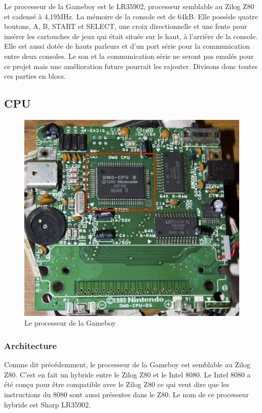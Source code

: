 \documentclass[a4paper]{article}
\begin{document}
Le processeur de la Gameboy est le LR35902, processeur semblable au Zilog Z80 et
cadensé à 4,19MHz. La mémoire de la console est de 64kB. Elle possède quatre boutons, 
A, B, START et SELECT, une croix directionnelle et une fente pour insérer les 
cartouches de jeux qui était située sur le haut, à l'arrière de la console. Elle est
aussi dotée de hauts parleurs et d'un port série pour la communication entre deux
consoles. Le son et la communication série ne seront pas emulés pour ce projet
mais une amélioration future pourrait les rajouter. Divisons donc toutes ces parties
en blocs.

\newpage


\subsection{CPU}

\begin{figure}[!h]
  \centering
  \includegraphics[scale=0.1]{images/cpu.jpg}
  \caption{Le processeur de la Gameboy}
\end{figure}

\subsubsection{Architecture}
Comme dit précédemment, le processeur de la Gameboy est semblable au Zilog Z80.
C'est en fait un hybride entre le Zilog Z80 et le Intel 8080. Le Intel 8080 a été
conçu pour être compatible avec le Zilog Z80 ce qui veut dire que les instructions
du 8080 sont aussi présentes dans le Z80. Le nom de ce processeur hybride est Sharp
LR35902. \\
\end{document}
